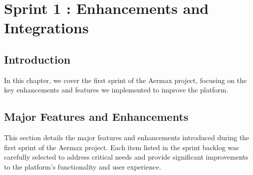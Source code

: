 \chapter{ Sprint 1 : Enhancements and Integrations}
\setcounter{secnumdepth}{0}

\section{Introduction}
In this chapter, we cover the first sprint of the Aermax project, focusing on the key enhancements and features we implemented to improve the platform.
\setcounter{secnumdepth}{2} 
\section{Major Features and Enhancements}
This section details the major features and enhancements introduced during the first sprint of the Aermax project. Each item listed in the sprint backlog was carefully selected to address critical needs and provide significant improvements to the platform's functionality and user experience.
